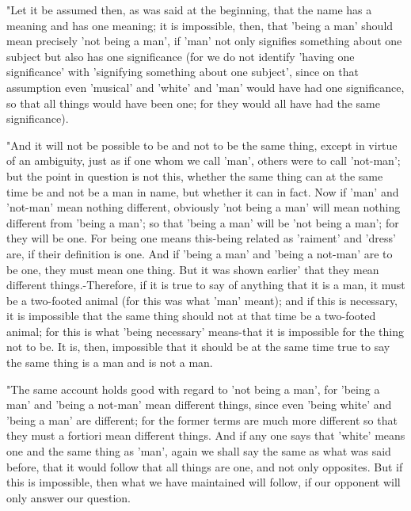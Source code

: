 "Let it be assumed then, as was said at the beginning, that the name
has a meaning and has one meaning; it is impossible, then, that 'being
a man' should mean precisely 'not being a man', if 'man' not only
signifies something about one subject but also has one significance
(for we do not identify 'having one significance' with 'signifying
something about one subject', since on that assumption even 'musical'
and 'white' and 'man' would have had one significance, so that all
things would have been one; for they would all have had the same significance).

"And it will not be possible to be and not to be the same thing, except
in virtue of an ambiguity, just as if one whom we call 'man', others
were to call 'not-man'; but the point in question is not this, whether
the same thing can at the same time be and not be a man in name, but
whether it can in fact. Now if 'man' and 'not-man' mean nothing different,
obviously 'not being a man' will mean nothing different from 'being
a man'; so that 'being a man' will be 'not being a man'; for they
will be one. For being one means this-being related as 'raiment' and
'dress' are, if their definition is one. And if 'being a man' and
'being a not-man' are to be one, they must mean one thing. But it
was shown earlier' that they mean different things.-Therefore, if
it is true to say of anything that it is a man, it must be a two-footed
animal (for this was what 'man' meant); and if this is necessary,
it is impossible that the same thing should not at that time be a
two-footed animal; for this is what 'being necessary' means-that it
is impossible for the thing not to be. It is, then, impossible that
it should be at the same time true to say the same thing is a man
and is not a man. 

"The same account holds good with regard to 'not being a man', for
'being a man' and 'being a not-man' mean different things, since even
'being white' and 'being a man' are different; for the former terms
are much more different so that they must a fortiori mean different
things. And if any one says that 'white' means one and the same thing
as 'man', again we shall say the same as what was said before, that
it would follow that all things are one, and not only opposites. But
if this is impossible, then what we have maintained will follow, if
our opponent will only answer our question. 

